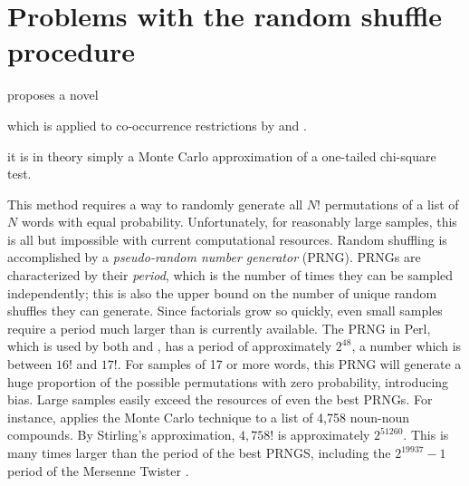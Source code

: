 \chapter{Problems with the random shuffle procedure} 
\label{zr}

\citet{Kessler2001,Kessler2008} proposes a novel 

which is applied to co-occurrence restrictions by \citet{Brown2010} and \citet{Martin2007,2011}.

it is in theory simply a Monte Carlo approximation of a one-tailed chi-square test. 

This method requires a way to randomly generate all $N!$ permutations of a list of $N$ words with equal probability. Unfortunately, for reasonably large samples, this is all but impossible with current computational resources. Random shuffling is accomplished by a \emph{pseudo-random number generator} (PRNG). PRNGs are characterized by their \emph{period}, which is the number of times they can be sampled independently; this is also the upper bound on the number of unique random shuffles they can generate. Since factorials grow so quickly, even small samples require a period much larger than is currently available. The PRNG in Perl, which is used by both \citeauthor{Martin2011} and \citeauthor{Brown2010}, has a period of approximately $2^{48}$, a number which is between $16!$ and $17!$. For samples of 17 or more words, this PRNG will generate a huge proportion of the possible permutations with zero probability, introducing bias. Large samples easily exceed the resources of even the best PRNGs. For instance, \citet{Martin2007} applies the Monte Carlo technique to a list of 4,758 noun-noun compounds. By Stirling's approximation, $4,758!$ is approximately $2 ^ {51260}$. This is many times larger than the period of the best PRNGS, including the $2^{19937} - 1$ period of the Mersenne Twister \citep{Matsumoto1998}.
